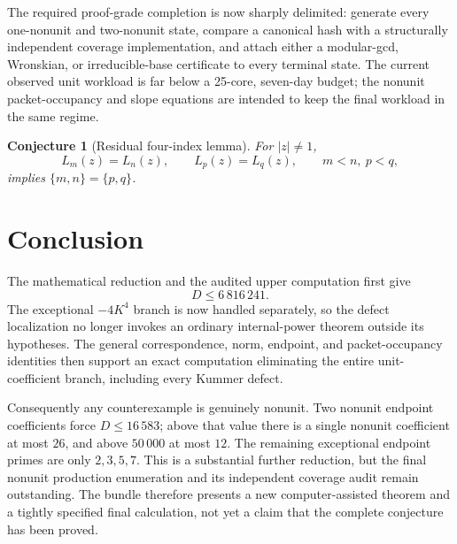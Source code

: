 \documentclass[11pt]{article}
\newtheorem{conjecture}[theorem]{Conjecture}
\theoremstyle{definition}
\begin{document}
The required proof-grade completion is now sharply delimited: generate every
one-nonunit and two-nonunit state, compare a canonical hash with a structurally
independent coverage implementation, and attach either a modular-gcd,
Wronskian, or irreducible-base certificate to every terminal state.  The
current observed unit workload is far below a 25-core, seven-day budget; the
nonunit packet-occupancy and slope equations are intended to keep the final
workload in the same regime.

\begin{conjecture}[Residual four-index lemma]\label{conj:fourindex}
For \(|z|\neq1\),
\[
 L_m(z)=L_n(z),\qquad L_p(z)=L_q(z),
 \qquad m<n,\ p<q,
\]
implies \(\{m,n\}=\{p,q\}\).
\end{conjecture}

\section*{Conclusion}

The mathematical reduction and the audited upper computation first give
\[
 D\leq6\,816\,241.
\]
The exceptional \(-4K^4\) branch is now handled separately, so the defect
localization no longer invokes an ordinary internal-power theorem outside its
hypotheses.  The general correspondence, norm, endpoint, and packet-occupancy
identities then support an exact computation eliminating the entire
unit-coefficient branch, including every Kummer defect.

Consequently any counterexample is genuinely nonunit.  Two nonunit endpoint
coefficients force \(D\leq16\,583\); above that value there is a single
nonunit coefficient at most \(26\), and above \(50\,000\) at most \(12\).
The remaining exceptional endpoint primes are only \(2,3,5,7\).  This is a
substantial further reduction, but the final nonunit production enumeration
and its independent coverage audit remain outstanding.  The bundle therefore
presents a new computer-assisted theorem and a tightly specified final
calculation, not yet a claim that the complete conjecture has been proved.
\end{document}
